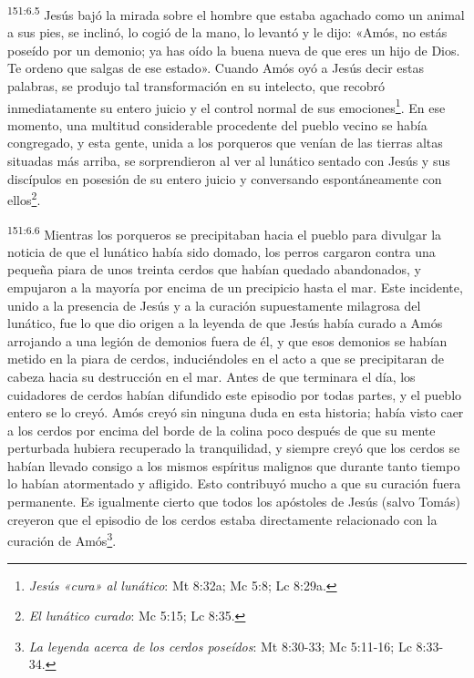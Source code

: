 \par
\textsuperscript{151:6.5} Jesús bajó la mirada sobre el hombre que estaba agachado como un animal a sus pies, se inclinó, lo cogió de la mano, lo levantó y le dijo: «Amós, no estás poseído por un demonio; ya has oído la buena nueva de que eres un hijo de Dios. Te ordeno que salgas de ese estado». Cuando Amós oyó a Jesús decir estas palabras, se produjo tal transformación en su intelecto, que recobró inmediatamente su entero juicio y el control normal de sus emociones\footnote{\textit{Jesús «cura» al lunático}: Mt 8:32a; Mc 5:8; Lc 8:29a.}. En ese momento, una multitud considerable procedente del pueblo vecino se había congregado, y esta gente, unida a los porqueros que venían de las tierras altas situadas más arriba, se sorprendieron al ver al lunático sentado con Jesús y sus discípulos en posesión de su entero juicio y conversando espontáneamente con ellos\footnote{\textit{El lunático curado}: Mc 5:15; Lc 8:35.}.

\par
\textsuperscript{151:6.6} Mientras los porqueros se precipitaban hacia el pueblo para divulgar la noticia de que el lunático había sido domado, los perros cargaron contra una pequeña piara de unos treinta cerdos que habían quedado abandonados, y empujaron a la mayoría por encima de un precipicio hasta el mar. Este incidente, unido a la presencia de Jesús y a la curación supuestamente milagrosa del lunático, fue lo que dio origen a la leyenda de que Jesús había curado a Amós arrojando a una legión de demonios fuera de él, y que esos demonios se habían metido en la piara de cerdos, induciéndoles en el acto a que se precipitaran de cabeza hacia su destrucción en el mar. Antes de que terminara el día, los cuidadores de cerdos habían difundido este episodio por todas partes, y el pueblo entero se lo creyó. Amós creyó sin ninguna duda en esta historia; había visto caer a los cerdos por encima del borde de la colina poco después de que su mente perturbada hubiera recuperado la tranquilidad, y siempre creyó que los cerdos se habían llevado consigo a los mismos espíritus malignos que durante tanto tiempo lo habían atormentado y afligido. Esto contribuyó mucho a que su curación fuera permanente. Es igualmente cierto que todos los apóstoles de Jesús (salvo Tomás) creyeron que el episodio de los cerdos estaba directamente relacionado con la curación de Amós\footnote{\textit{La leyenda acerca de los cerdos poseídos}: Mt 8:30-33; Mc 5:11-16; Lc 8:33-34.}.

